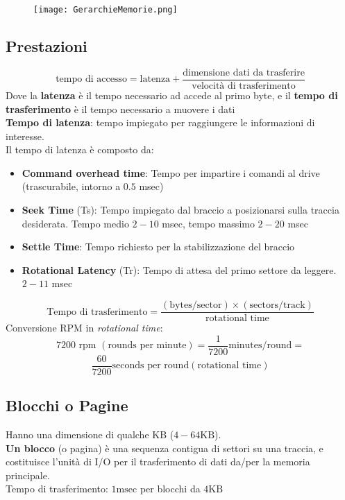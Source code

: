 \begin{figure}[h]
    \centering
    \texttt{[image: GerarchieMemorie.png]}
    \label{fig:memorie}
\end{figure}

\subsection{Prestazioni}
$$\text{tempo di accesso} = \text{latenza} + \frac{\text{dimensione dati da trasferire}}{\text{velocità di trasferimento}}$$
Dove la \textbf{latenza} \`e il tempo necessario ad accede al primo byte, e il \textbf{tempo di trasferimento} \`e il tempo necessario a muovere i dati\\
\textbf{Tempo di latenza}: tempo impiegato per raggiungere le informazioni di interesse.\\
Il tempo di latenza \`e composto da:
\begin{itemize}
    \item \textbf{Command overhead time}: Tempo per impartire i comandi al drive (trascurabile, intorno a $0.5$ msec)
    \item \textbf{Seek Time} (Ts): Tempo impiegato dal braccio a posizionarsi sulla traccia desiderata. Tempo medio $2-10$ msec, tempo massimo $2-20$ msec
    \item \textbf{Settle Time}: Tempo richiesto per la stabilizzazione del braccio
    \item \textbf{Rotational Latency} (Tr): Tempo di attesa del primo settore da leggere. $2-11$ msec
\end{itemize}
$$\text{Tempo di trasferimento} = \frac{(\text{bytes}/\text{sector}) \times (\text{sectors}/\text{track})}{\text{rotational time}}$$
Conversione RPM in \textit{rotational time}:
$$7200 \text{ rpm } (\text{rounds per minute})= \frac{1}{7200} \text{minutes}/\text{round} =$$
$$ \frac{60}{7200} \text{seconds per round} (\text{rotational time})$$

\subsection{Blocchi o Pagine}
Hanno una dimensione di qualche KB ($4-64 \text{KB}$).\\
\textbf{Un blocco} (o pagina) è una sequenza contigua di settori su una traccia, e costituisce l'unità di I/O per il trasferimento di dati da/per la memoria principale.\\
Tempo di trasferimento: $1 \text{msec}$ per blocchi da $4 \text{KB}$

